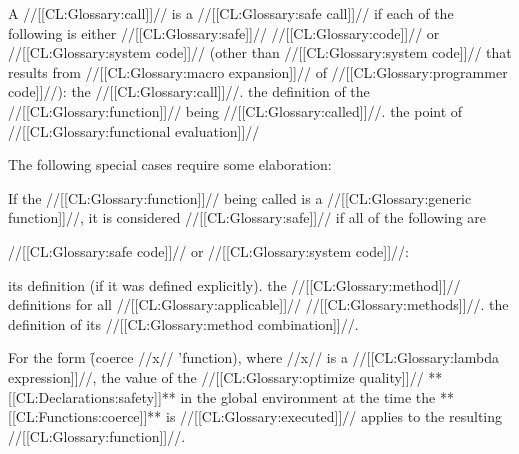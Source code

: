 





A //[[CL:Glossary:call]]// is a //[[CL:Glossary:safe call]]// if each of the following is
either //[[CL:Glossary:safe]]// //[[CL:Glossary:code]]// or //[[CL:Glossary:system code]]// (other than
//[[CL:Glossary:system code]]// that results from //[[CL:Glossary:macro expansion]]// of 
//[[CL:Glossary:programmer code]]//):
\beginlist
\itemitem{\bull} the //[[CL:Glossary:call]]//.
\itemitem{\bull} the definition of the //[[CL:Glossary:function]]// being //[[CL:Glossary:called]]//.
\itemitem{\bull} the point of //[[CL:Glossary:functional evaluation]]// 
\endlist

The following special cases require some elaboration:

\beginlist
\itemitem{\bull}
If the //[[CL:Glossary:function]]// being called is a //[[CL:Glossary:generic function]]//,
it is considered //[[CL:Glossary:safe]]// if all of the following are

//[[CL:Glossary:safe code]]// or //[[CL:Glossary:system code]]//:


\beginlist
\itemitem{--} its definition (if it was defined explicitly).
\itemitem{--} the //[[CL:Glossary:method]]// definitions for all //[[CL:Glossary:applicable]]// //[[CL:Glossary:methods]]//.
\itemitem{--} the definition of its //[[CL:Glossary:method combination]]//.
\endlist

\itemitem{\bull}
For the form \f{(coerce //x// 'function)}, 
where //x// is a //[[CL:Glossary:lambda expression]]//,
the value of the //[[CL:Glossary:optimize quality]]// **[[CL:Declarations:safety]]**
in the global environment at the time the **[[CL:Functions:coerce]]**
is //[[CL:Glossary:executed]]// applies to the resulting //[[CL:Glossary:function]]//.

















